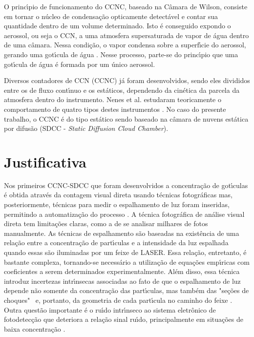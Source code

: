 O princ\'{\i}pio de funcionamento do CCNC, baseado na C\^{a}mara de Wilson, consiste
em tornar o n\'{u}cleo de condensa\c{c}\~{a}o opticamente detect\'{a}vel e contar
sua quantidade dentro de um volume determinado. Isto \'{e} conseguido
expondo o aerossol, ou seja o CCN, a uma atmosfera supersaturada de
vapor de \'{a}gua dentro de uma c\^{a}mara. Nessa condi\c{c}\~{a}o, o vapor condensa sobre
a superf\'{\i}cie do aerossol, gerando uma got\'{\i}cula de \'{a}gua \cite{wilson}. Nesse
processo, parte-se do princ\'{\i}pio que uma got\'{\i}cula de \'{a}gua \'{e} formada por um \'{u}nico aerossol.

Diversos contadores de CCN (CCNC) j\'{a} foram desenvolvidos, sendo eles divididos entre os de fluxo cont\'{\i}nuo e os est\'{a}ticos, dependendo da cin\'{e}tica da parcela da atmosfera dentro do instrumento. Nenes et al. estudaram teoricamente o comportamento de quatro tipos destes instrumentos \cite{Nenes}. No caso do presente trabalho, o CCNC \'{e} do tipo est\'{a}tico sendo baseado na c\^{a}mara de nuvens est\'{a}tica por difus\~{a}o (SDCC - \textit{Static Diffusion Cloud Chamber}).



\section{Justificativa}

Nos primeiros CCNC-SDCC que foram desenvolvidos a concentra\c{c}\~{a}o de got\'{\i}culas \'{e} obtida atrav\'{e}s da contagem visual direta usando t\'{e}cnicas fotogr\'{a}ficas mas, posteriormente, t\'{e}cnicas para medir o espalhamento de luz foram inseridas, permitindo a automatiza\c{c}\~{a}o do processo \cite{twomey,Lala}. A t\'{e}cnica fotogr\'{a}fica de an\'{a}lise visual direta tem limita\c{c}\~{o}es claras, como a de se analisar milhares de fotos manualmente. As t\'{e}cnicas de espalhamento s\~{a}o baseadas na exist\^{e}ncia de uma rela\c{c}\~{a}o entre a concentra\c{c}\~{a}o de part\'{\i}culas e a intensidade da luz espalhada quando essas s\~{a}o iluminadas por um feixe de LASER. Essa rela\c{c}\~{a}o, entretanto, \'{e} bastante complexa, tornando-se necess\'{a}rio a utiliza\c{c}\~{a}o de equa\c{c}\~{o}es emp\'{\i}ricas com coeficientes a serem determinados experimentalmente. Al\'{e}m disso, essa t\'{e}cnica introduz incertezas intr\'{\i}nsecas associadas ao fato de que o espalhamento de luz depende n\~{a}o somente da concentra\c{c}\~{a}o das part\'{\i}culas, mas tamb\'{e}m das "se\c{c}\~{o}es de choques" \ e, portanto, da geometria de cada part\'{\i}cula no caminho do feixe \cite{Oliveira}. Outra quest\~{a}o importante \'{e} o ru\'{\i}do intr\'{\i}nseco  ao sistema eletr\^{o}nico de fotodetec\c{c}\~{a}o  que deteriora a rela\c{c}\~{a}o sinal ru\'{\i}do, principalmente em situa\c{c}\~{o}es de baixa concentra\c{c}\~{a}o \cite{Pinheiro}.


